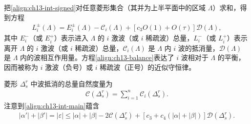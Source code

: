 \documentclass[../../main.tex]{subfiles}
\begin{document}
把\eqref{align:ch13-int-signed}对任意菱形集合（其并为上半平面中的区域 $\Lambda$）求和，得到方程
\begin{align}
L_i^{\pm}(\Lambda)=E_i^{\pm}(\Lambda)-\mathscr{C}_i(\Lambda)+[c_3O(1)+O(\tau)]\mathscr{D}(\Lambda),
\label{align:ch13-balance}
\end{align}
其中 $E_i^-$（或 $E_i^+$）表示进入 $\Lambda$ 的 $i$ 激波（或 $i$ 稀疏波）总量，$L_i^-$（或 $L_i^+$）表示离开 $\Lambda$ 的 $i$ 激波（或 $i$ 稀疏波）总量，$\mathscr{C}_i(\Lambda)$ 是 $\Lambda$ 内 $i$ 波的抵消量，$\mathscr{D}(\Lambda)$ 是 $\Lambda$ 内的波相互作用量。方程\eqref{align:ch13-balance}表达了 $i$ 波相对于 $\Lambda$ 的平衡，因而被称为 $i$ 激波（负号）或 $i$ 稀疏波（正号）的近似守恒律。

菱形 $\Delta_s^r$ 中波抵消的总量自然度量为
\begin{align}
\mathscr{C}(\Delta_s^r)=\sum_{i=1}^n\mathscr{C}_i(\Delta_s^r).
\label{align:ch13-C-def}
\end{align}
注意到\eqref{align:ch13-int-main}蕴含
\begin{align}
|\alpha'|+|\beta'|=|\varepsilon|\leqslant|\alpha|+|\beta|-2\mathscr{C}(\Delta_s^r)+[c_3+c_4(|\alpha|+|\beta|)]\mathscr{D}(\Delta_s^r).
\label{align:ch13-cancel-est}
\end{align}
\end{document}
